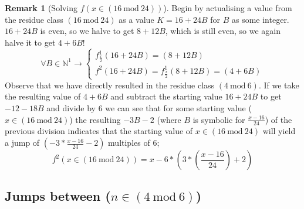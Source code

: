 \documentclass[12pt,a4paper]{amsart}
\numberwithin{equation}{section}
\theoremstyle{plain}
\theoremstyle{definition}
\newtheorem{Rem}[Th]{Remark}
\begin{document}
\begin{Rem}[Solving $f \left ( x \in \left ( 16\:\mathrm{mod}\:24 \right ) \right )$]
Begin by actualising a value from the residue class $\left ( 16\:\mathrm{mod}\:24 \right )$ as a value $K = 16 + 24B$ for $B$ as some integer. $16 + 24B$ is even, so we halve to get $8 + 12B$, which is still even, so we again halve it to get $4+6B$!
\begin{equation}
\forall B \in \mathbb{N}^{1} \rightarrow \left \{  \begin{matrix}
f^{1}_{\frac{x}{2}} \left ( 16+24B \right ) = \left ( 8+12B \right ) \\ 
f^{2} \left ( 16+24B \right ) = f^{1}_{\frac{x}{2}} \left ( 8+12B \right ) =  \left ( 4+6B \right )
\end{matrix} \right.
\end{equation}
Observe that we have directly resulted in the residue class  $\left ( 4\:\mathrm{mod}\:6 \right )$. If we take the resulting value of $4+6B$ and subtract the starting value $16+24B$ to get $-12-18B$ and divide by $6$ we can see that for some starting value ($x \in \left ( 16\:\mathrm{mod}\:24 \right )$) the resulting $-3B-2$ (where $B$ is symbolic for $\frac{x-16}{24}$) of the previous division indicates that the starting value of $x \in \left ( 16\:\mathrm{mod}\:24 \right )$ will yield a jump of $\left ( -3*\frac{x-16}{24} - 2 \right )$ multiples of $6$;
\begin{equation}
f^{2} \left ( x \in \left ( 16\:\mathrm{mod}\:24 \right ) \right ) = x-6*\left ( 3*\left (\frac{x-16}{24}  \right ) + 2 \right )
\end{equation}
\end{Rem}

\subsection{Jumps between ($n \in \left ( 4\:\mathrm{mod}\:6 \right )$)} \hfill\\
\end{document}
